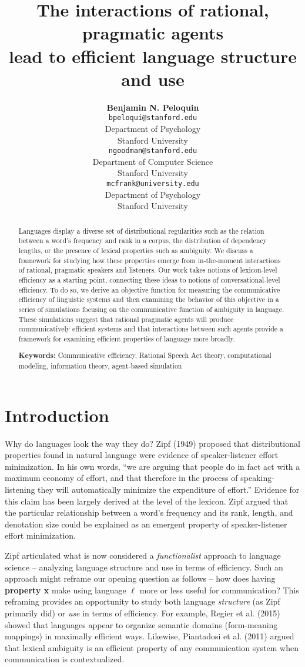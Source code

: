 \documentclass[10pt, letterpaper]{article}
\title{The interactions of rational, pragmatic agents\\
lead to efficient language structure and use}
\author{{\large \bf Benjamin N. Peloquin} \\ \texttt{bpeloqui@stanford.edu} \\ Department of Psychology \\ Stanford University \And {\large \bf Noah D. Goodman} \\ \texttt{ngoodman@stanford.edu} \\ Department of Computer Science \\ Stanford University \And {\large \bf Michael C. Frank} \\ \texttt{mcfrank@university.edu} \\ Department of Psychology \\ Stanford University}
\begin{document}
\maketitle

\begin{abstract}
Languages display a diverse set of distributional regularities such as
the relation between a word's frequency and rank in a corpus, the
distribution of dependency lengths, or the presence of lexical
properties such as ambiguity. We discuss a framework for studying how
these properties emerge from in-the-moment interactions of rational,
pragmatic speakers and listeners. Our work takes notions of
lexicon-level efficiency as a starting point, connecting these ideas to
notions of conversational-level efficiency. To do so, we derive an
objective function for measuring the communicative efficiency of
linguistic systems and then examining the behavior of this objective in
a series of simulations focusing on the communicative function of
ambiguity in language. These simulations suggest that rational pragmatic
agents will produce communicatively efficient systems and that
interactions between such agents provide a framework for examining
efficient properties of language more broadly.

\textbf{Keywords:}
Communicative efficiency, Rational Speech Act theory, computational
modeling, information theory, agent-based simulation
\end{abstract}

\section{Introduction}\label{introduction}

Why do languages look the way they do? Zipf (1949) proposed that
distributional properties found in natural language were evidence of
speaker-listener effort minimization. In his own words, ``we are arguing
that people do in fact act with a maximum economy of effort, and that
therefore in the process of speaking-listening they will automatically
minimize the expenditure of effort.'' Evidence for this claim has been
largely derived at the level of the lexicon. Zipf argued that the
particular relationship between a word's frequency and its rank, length,
and denotation size could be explained as an emergent property of
speaker-listener effort minimization. \par

Zipf articulated what is now considered a \emph{functionalist} approach
to language science -- analyzing language structure and use in terms of
efficiency. Such an approach might reframe our opening question as
follows -- how does having \textbf{property x} make using language
\(\ell\) more or less useful for communication? This reframing provides
an opportunity to study both language \emph{structure} (as Zipf
primarily did) or \emph{use} in terms of efficiency. For example, Regier
et al. (2015) showed that languages appear to organize semantic domains
(form-meaning mappings) in maximally efficient ways. Likewise,
Piantadosi et al. (2011) argued that lexical ambiguity is an efficient
property of any communication system when communication is
contextualized.\par
\end{document}
